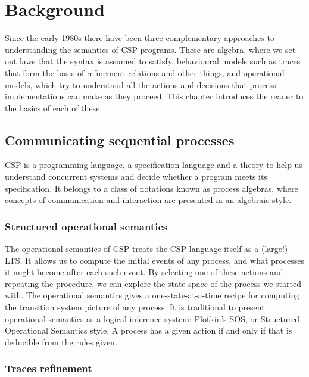 \chapter{Background}

Since the early 1980s there have been three complementary approaches to understanding the semantics of CSP programs. These are algebra, where we set out laws that the syntax is assumed to satisfy, behavioural models such as traces that form the basis of refinement relations and other things, and operational models, which try to understand all the actions and decisions that process implementations can make as they proceed. This chapter introduces the reader to the basics of each of these.

\section{Communicating sequential processes}


CSP is a programming language, a specification language and a theory to help us understand concurrent systems and decide whether a program meets its specification. It belongs to a class of notations known as process algebras, where concepts of communication and  interaction are presented in an algebraic style.

\subsection{Structured operational semantics}

The operational semantics of CSP treats the CSP language itself as a (large!) LTS. It allows us to compute the initial events of any  process, and what processes it might become after each such event. By selecting one of these actions and repeating the procedure, we can explore the state space of the process we started with. The operational semantics gives a one-state-at-a-time recipe for computing the transition system picture of any process. It is traditional to present operational semantics as a logical inference system: Plotkin’s SOS, or Structured Operational Semantics style. A process has a given action if and only if that is deducible from the rules given.

\subsection{Traces refinement}

